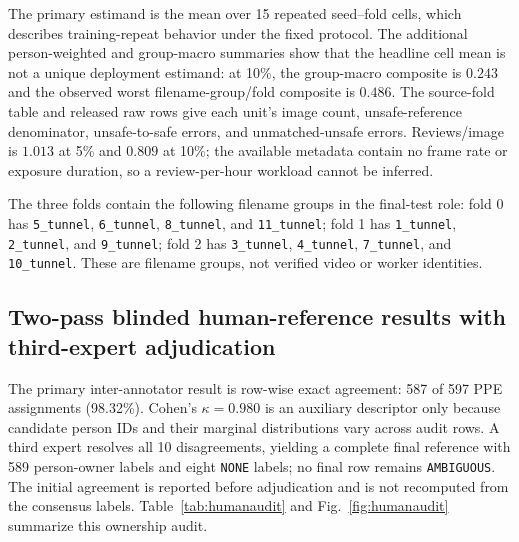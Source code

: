\documentclass[iicol,pdflatex,sn-mathphys-num]{sn-jnl}
\begin{document}
The primary estimand is the mean over 15 repeated seed--fold cells, which describes training-repeat behavior under the fixed protocol. The additional person-weighted and group-macro summaries show that the headline cell mean is not a unique deployment estimand: at 10\%, the group-macro composite is $0.243$ and the observed worst filename-group/fold composite is $0.486$. The source-fold table and released raw rows give each unit's image count, unsafe-reference denominator, unsafe-to-safe errors, and unmatched-unsafe errors. Reviews/image is $1.013$ at 5\% and $0.809$ at 10\%; the available metadata contain no frame rate or exposure duration, so a review-per-hour workload cannot be inferred.

The three folds contain the following filename groups in the final-test role: fold 0 has \texttt{5\_tunnel}, \texttt{6\_tunnel}, \texttt{8\_tunnel}, and \texttt{11\_tunnel}; fold 1 has \texttt{1\_tunnel}, \texttt{2\_tunnel}, and \texttt{9\_tunnel}; fold 2 has \texttt{3\_tunnel}, \texttt{4\_tunnel}, \texttt{7\_tunnel}, and \texttt{10\_tunnel}. These are filename groups, not verified video or worker identities.

\subsection{Two-pass blinded human-reference results with third-expert adjudication}\label{sec:humanresults}

The primary inter-annotator result is row-wise exact agreement: 587 of 597 PPE assignments (98.32\%). Cohen's $\kappa=0.980$ is an auxiliary descriptor only because candidate person IDs and their marginal distributions vary across audit rows. A third expert resolves all 10 disagreements, yielding a complete final reference with 589 person-owner labels and eight \texttt{NONE} labels; no final row remains \texttt{AMBIGUOUS}. The initial agreement is reported before adjudication and is not recomputed from the consensus labels. Table~\ref{tab:humanaudit} and Fig.~\ref{fig:humanaudit} summarize this ownership audit.
\end{document}
